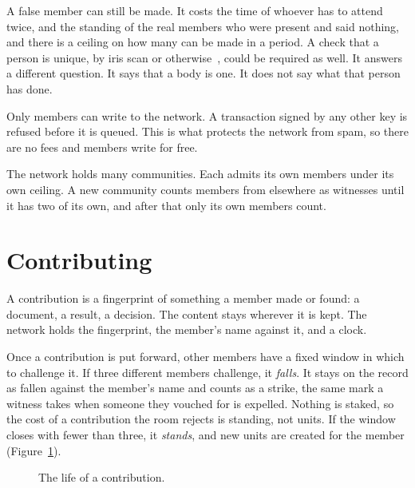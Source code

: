 \documentclass[11pt,a4paper]{article}
\begin{document}
A false member can still be made. It costs the time of whoever has to attend twice, and the standing of the real members who were present and said nothing, and there is a ceiling on how many can be made in a period. A check that a person is unique, by iris scan or otherwise~\cite{worldcoin2023}, could be required as well. It answers a different question. It says that a body is one. It does not say what that person has done.

Only members can write to the network. A transaction signed by any other key is refused before it is queued. This is what protects the network from spam, so there are no fees and members write for free.

The network holds many communities. Each admits its own members under its own ceiling. A new community counts members from elsewhere as witnesses until it has two of its own, and after that only its own members count.

\section{Contributing}
\label{sec:contributing}

A contribution is a fingerprint of something a member made or found: a document, a result, a decision. The content stays wherever it is kept. The network holds the fingerprint, the member's name against it, and a clock.

Once a contribution is put forward, other members have a fixed window in which to challenge it. If three different members challenge, it \emph{falls}. It stays on the record as fallen against the member's name and counts as a strike, the same mark a witness takes when someone they vouched for is expelled. Nothing is staked, so the cost of a contribution the room rejects is standing, not units. If the window closes with fewer than three, it \emph{stands}, and new units are created for the member (Figure~\ref{fig:point}).

\begin{figure}[h]
\centering
{}
\caption{The life of a contribution.}
\label{fig:point}
\end{figure}
\end{document}
